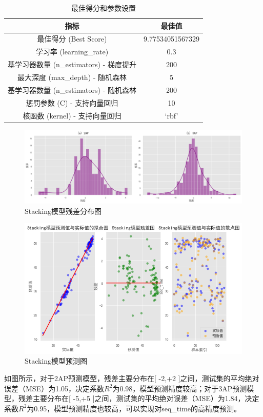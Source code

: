 \begin{table}[H]
	\centering
	\caption{最佳得分和参数设置}
	\begin{tabular}{cc}
		\toprule
		指标 & 最佳值 \\
		\midrule
		最佳得分 (Best Score) & 9.77534051567329 \\
		学习率 (learning\_rate) & 0.3 \\
		基学习器数量 (n\_estimators) - 梯度提升 & 200 \\
		最大深度 (max\_depth) - 随机森林 & 5 \\
		基学习器数量 (n\_estimators) - 随机森林 & 200 \\
		惩罚参数 (C) - 支持向量回归 & 10 \\
		核函数 (kernel) - 支持向量回归 & `rbf' \\
		\bottomrule
	\end{tabular}
\end{table}





\begin{figure}[H]
	\centering
	\includegraphics[width=0.9\linewidth]{figures/2ap和3ap残差图}
	\caption{Stacking模型残差分布图}
	\label{fig:2ap3ap}
\end{figure}


\begin{figure}[H]
	\centering
	\includegraphics[width=0.8\linewidth]{figures/2ap结果}
	\caption{Stacking模型预测图}
	\label{fig:2ap}
\end{figure}



如图所示，对于2AP预测模型，残差主要分布在[ -2,+2 ]之间，测试集的平均绝对误差（MSE）为1.05，决定系数${R}^{2}$为0.98，模型预测精度较高；对于3AP预测模型，残差主要分布在[ -5,+5 ]之间，测试集的平均绝对误差（MSE）为1.84，决定系数${R}^{2}$为0.95，模型预测精度也较高，可以实现对seq\_time的高精度预测。
